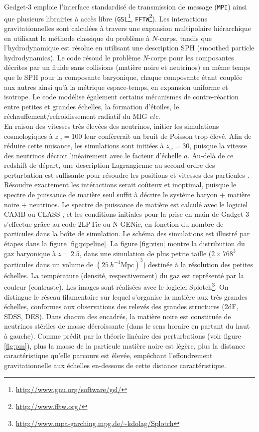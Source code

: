 \textsf{Gedget-3} emploie l'interface standardisé de transmission de message (\texttt{MPI}) ainsi que plusieurs librairies à accès libre (\texttt{GSL}\footnote{\url{http://www.gnu.org/software/gsl/}}, \texttt{FFTW}\footnote{\url{http://www.fftw.org/}}). Les interactions gravitationnelles sont calculées à travers une expansion multipolaire hiérarchique en utilisant la méthode classique du problème à $N$-corps, tandis que l'hydrodynamique est résolue en utilisant une description SPH (smoothed particle hydrodynamics). Le code résoud le problème $N$-corps pour les composantes décrites par un fluide sans collisions (matière noire et neutrinos) en même temps que le SPH pour la composante baryonique, chaque composante étant couplée aux autres ainsi qu'à la métrique espace-temps, en expansion uniforme et isotrope. Le code modélise également certains mécanismes de contre-réaction entre petites et grandes échelles, la formation d'étoiles, le réchauffement/refroidissement radiatif du MIG \textit{etc}. \\

En raison des vitesses très élevées des neutrinos, initier les simulations cosmologiques à $z_{\mathrm{ic}}=100$ leur confèrerait un bruit de Poisson trop élevé. Afin de réduire cette nuisance, les simulations sont initiées à $z_{\mathrm{ic}}=30$, puisque la vitesse des neutrinos décroit linéairement avec le facteur d'échelle $a$. Au-delà de ce redshift de départ, une description Lagrangienne au second ordre des perturbation est suffisante pour résoudre les positions et vitesses des particules \citep{Crocce2006}. Résoudre exactement les intéractions serait coûteux et inoptimal, puisque le spectre de puissance de matière seul suffit à décrire le système baryon + matière noire + neutrinos. Le spectre de puissance de matière est calculé avec le logiciel \textsf{CAMB} \citep{Lewis2011} ou \textsf{CLASS} \citep{CLASS}, et les conditions initiales pour la prise-en-main de \textsf{Gadget-3} s'effectue grâce au code \textsf{2LPTic} ou \textsf{N-GENic}, en fonction du nombre de particules dans la boîte de simulation. Le schéma des simulations est illustré par étapes dans la figure \ref{fig:pipeline}. La figure \ref{fig:visu} montre la distribution du gaz baryonique à $z=2.5$, dans une simulation de plus petite taille ($2 \times 768^3$ particules dans un volume de $(25~h^{-1}\mathrm{Mpc})^3$) destinée à la résolution des petites échelles. La température (densité, respectivement) du gaz est représenté par la couleur (contraste). Les images sont réalisées avec le logiciel \textsf{Splotch}\footnote{\url{http://www.mpa-garching.mpg.de/~kdolag/Splotch}}. On distingue le réseau filamentaire sur lequel s'organise la matière aux très grandes échelles, conformes aux observations des relevés des grandes structures (2dF, SDSS, DES). Dans chacun des encadrés, la matière noire est constituée de neutrinos stériles de masse décroissante (dans le sens horaire en partant du haut à gauche). Comme prédit par la théorie linéaire des perturbations (voir figure \ref{fig:pm}), plus la masse de la particule matière noire est légère, plus la distance caractéristique qu'elle parcours est élevée, empêchant l'effondrement gravitationnelle aux échelles en-dessous de cette distance caractéristique. \\

